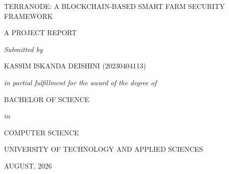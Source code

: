 \documentclass[12pt,a4paper]{report}
\begin{document}
\begin{titlepage}
    \centering
    \vspace*{1cm}
    
    {\fontsize{12pt}{18pt}\selectfont TERRANODE: A BLOCKCHAIN-BASED SMART FARM SECURITY FRAMEWORK\par}
    
    \vspace{2cm}
    
    {\fontsize{12pt}{18pt}\selectfont A PROJECT REPORT\par}
    
    \vspace{1.5cm}
    
    {\fontsize{12pt}{18pt}\selectfont\textit{Submitted by}\par}
    
    \vspace{0.5cm}
    
    {\fontsize{12pt}{18pt}\selectfont KASSIM ISKANDA DEISHINI (20230404113)\par}
    
    \vspace{2cm}
    
    {\fontsize{12pt}{18pt}\selectfont\textit{in partial fulfillment for the award of the degree of}\par}
    
    \vspace{0.5cm}
    
    {\fontsize{12pt}{18pt}\selectfont BACHELOR OF SCIENCE\par}
    
    \vspace{1cm}
    
    {\fontsize{12pt}{18pt}\selectfont\textit{in}\par}
    
    \vspace{0.5cm}
    
    {\fontsize{12pt}{18pt}\selectfont COMPUTER SCIENCE\par}
    
    \vspace{2cm}
    
    {\fontsize{12pt}{18pt}\selectfont UNIVERSITY OF TECHNOLOGY AND APPLIED SCIENCES\par}
    
    \vspace{1cm}
    
    {\fontsize{12pt}{18pt}\selectfont AUGUST, 2026\par}
    
\end{titlepage}
\end{document}
